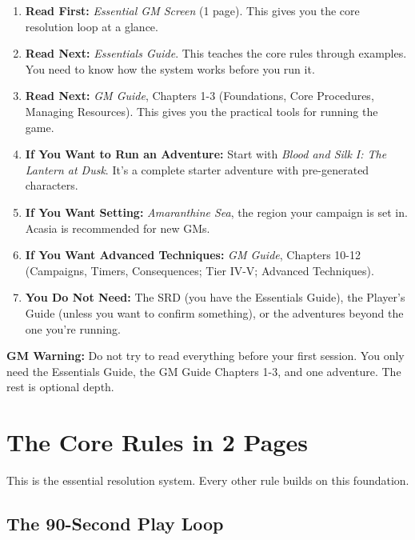 \documentclass[10pt]{article}
\begin{document}
\begin{enumerate}
\item \textbf{Read First:} \textit{Essential GM Screen} (1 page). This gives you the core resolution loop at a glance.
\item \textbf{Read Next:} \textit{Essentials Guide}. This teaches the core rules through examples. You need to know how the system works before you run it.
\item \textbf{Read Next:} \textit{GM Guide}, Chapters 1-3 (Foundations, Core Procedures, Managing Resources). This gives you the practical tools for running the game.
\item \textbf{If You Want to Run an Adventure:} Start with \textit{Blood and Silk I: The Lantern at Dusk}. It's a complete starter adventure with pre-generated characters.
\item \textbf{If You Want Setting:} \textit{Amaranthine Sea}, the region your campaign is set in. Acasia is recommended for new GMs.
\item \textbf{If You Want Advanced Techniques:} \textit{GM Guide}, Chapters 10-12 (Campaigns, Timers, Consequences; Tier IV-V; Advanced Techniques).
\item \textbf{You Do Not Need:} The SRD (you have the Essentials Guide), the Player's Guide (unless you want to confirm something), or the adventures beyond the one you're running.
\end{enumerate}

\begin{warningbox}
\textbf{GM Warning:} Do not try to read everything before your first session. You only need the Essentials Guide, the GM Guide Chapters 1-3, and one adventure. The rest is optional depth.
\end{warningbox}

\newpage

\section*{The Core Rules in 2 Pages}

This is the essential resolution system. Every other rule builds on this foundation.

\subsection*{The 90-Second Play Loop}
\end{document}
